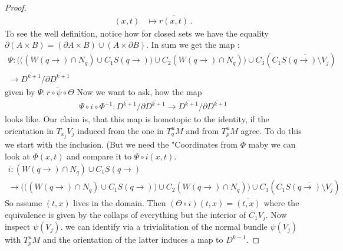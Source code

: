 \begin{proof}
\begin{align*}
	(x,t)		& \mapsto \overline{r(x,t)}\, .
\end{align*} To see the well definition, notice how for closed sets we have the equality $\partial(A\times B)=(\partial A \times B) \cup (A\times \partial B)$. 
In sum we get the map :
\begin{align*}
	\Psi: 	\Bigg( \Big( (W(q\to )\cap N_q)\cup C_1 S(q\to)\Big)\cup C_2 (W(q\to )\cap N_q)\Bigg)\cup  C_3 (C_1 \overline{S(q\to)\setminus V_j}) \\ 
	\to \overline{D^{k+1}} \big/ \partial \overline{D^{k+1}}
\end{align*} given by $\Psi: r \circ \tilde{\psi} \circ \Theta$
Now we want to ask, how the map 
\begin{align*}
	\Psi \circ i\circ \Phi^{-1}:\overline{D^{k+1}} \big/ \partial \overline{D^{k+1}} \to \overline{D^{k+1}} \big/ \partial \overline{D^{k+1}}
\end{align*} looks like. Our claim is, that this map is homotopic to the identity, if the orientation in $T_{x_j}V_j$ induced from the one in $T^u_qM$ and from $T^u_pM$ agree. 
To do this we start with the inclusion. (But we need the "Coordinates from $\Phi$ maby we can look at $\Phi(x,t)$ and compare it to $\Psi\circ i (x,t)$. 
\begin{align*}
	i: 	(W(q\to)\cap N_q)\cup C_1S(q\to)  \\
	\to 	\Bigg( \Big( (W(q\to )\cap N_q)\cup C_1 S(q\to)\Big)\cup C_2 (W(q\to )\cap N_q)\Bigg)\cup  C_3 (C_1 \overline{S(q\to)\setminus V_j})
\end{align*}So assume $(t,x)$ lives in the domain. Then 
$(\Theta\circ i )(t,x)=\overline{(t,x)}$ where the equivalence is given by the collaps of everything but the interior of $C_1V_j$. 	
Now inspect $\psi(V_j)$. we can identify via a trivialitation of the normal bundle $\psi(V_j)$ with $T^u_pM$ and the orientation of the latter induces a map to $D^{k-1}$. 

\end{proof}
